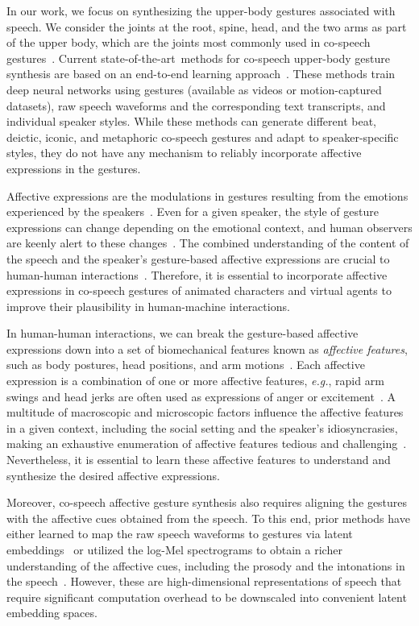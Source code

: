 \documentclass[conference,compsoc]{IEEEtran}
\theoremstyle{definition}
\newcommand{\sota}{state-of-the-art}
\begin{document}
In our work, we focus on synthesizing the upper-body gestures associated with speech. We consider the joints at the root, spine, head, and the two arms as part of the upper body, which are the joints most commonly used in co-speech gestures~\cite{trimodal,gesticulator}. Current \sota~methods for co-speech upper-body gesture synthesis are based on an end-to-end learning approach~\cite{individual_gesture_styles,trimodal,gesticulator}. These methods train deep neural networks using gestures (available as videos or motion-captured datasets), raw speech waveforms and the corresponding text transcripts, and individual speaker styles. While these methods can generate different beat, deictic, iconic, and metaphoric co-speech gestures and adapt to speaker-specific styles, they do not have any mechanism to reliably incorporate affective expressions in the gestures.

Affective expressions are the modulations in gestures resulting from the emotions experienced by the speakers~\cite{affective_body_survey1,affective_body_survey2}. Even for a given speaker, the style of gesture expressions can change depending on the emotional context, and human observers are keenly alert to these changes~\cite{affective_body_survey2}. The combined understanding of the content of the speech and the speaker's gesture-based affective expressions are crucial to human-human interactions~\cite{human_human1,human_human2}. Therefore, it is essential to incorporate affective expressions in co-speech gestures of animated characters and virtual agents to improve their plausibility in human-machine interactions.

In human-human interactions, we can break the gesture-based affective expressions down into a set of biomechanical features known as \textit{affective features}, such as body postures, head positions, and arm motions~\cite{affective_body_survey1}. Each affective expression is a combination of one or more affective features, \textit{e.g.}, rapid arm swings and head jerks are often used as expressions of anger or excitement~\cite{affective_body_survey2}. A multitude of macroscopic and microscopic factors influence the affective features in a given context, including the social setting and the speaker's idiosyncrasies, making an exhaustive enumeration of affective features tedious and challenging~\cite{taew}. Nevertheless, it is essential to learn these affective features to understand and synthesize the desired affective expressions.

Moreover, co-speech affective gesture synthesis also requires aligning the gestures with the affective cues obtained from the speech. To this end, prior methods have either learned to map the raw speech waveforms to gestures via latent embeddings~\cite{trimodal} or utilized the log-Mel spectrograms to obtain a richer understanding of the affective cues, including the prosody and the intonations in the speech~\cite{individual_gesture_styles,gesticulator}. However, these are high-dimensional representations of speech that require significant computation overhead to be downscaled into convenient latent embedding spaces.
\end{document}
